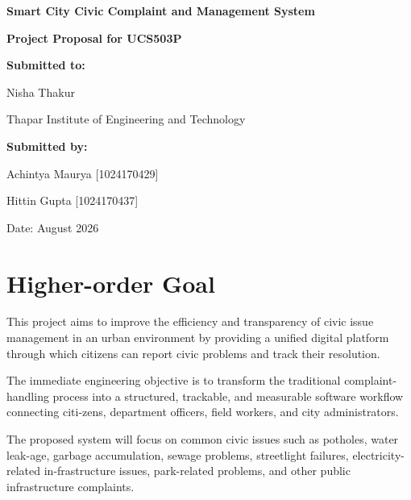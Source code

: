 \documentclass[12pt,a4paper]{article}
\begin{document}
\begin{titlepage}
\centering
\vspace*{0.9in}

{\bfseries\fontsize{18}{23}\selectfont
Smart City Civic Complaint and Management System\par}

\vspace{0.3in}

{\bfseries\fontsize{13}{17}\selectfont
Project Proposal for UCS503P\par}

\vspace{0.75in}

{\bfseries Submitted to:}\par
Nisha Thakur\par
Thapar Institute of Engineering and Technology\par

\vspace{0.35in}

{\bfseries Submitted by:}\par
Achintya Maurya [1024170429]\par
Hittin Gupta [1024170437]\par

\vfill
Date: August 2026

\end{titlepage}

\justifying
\section{Higher-order Goal}
This project aims to improve the efficiency and transparency of civic issue management in an urban environment by providing a unified digital platform through which citizens can report civic problems and track their resolution.

The immediate engineering objective is to transform the traditional complaint-handling process into a structured, trackable, and measurable software workflow connecting citi-zens, department officers, field workers, and city administrators.

The proposed system will focus on common civic issues such as potholes, water leak-age, garbage accumulation, sewage problems, streetlight failures, electricity-related in-frastructure issues, park-related problems, and other public infrastructure complaints.
\end{document}
